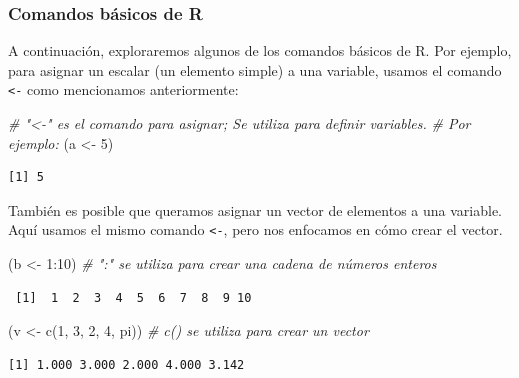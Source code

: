 \documentclass[
  12pt,
  spanish,
]{book}
\newenvironment{Shaded}{\begin{snugshade}}{\end{snugshade}}
\newcommand{\CommentTok}[1]{\textcolor[rgb]{0.56,0.35,0.01}{\textit{#1}}}
\newcommand{\DecValTok}[1]{\textcolor[rgb]{0.00,0.00,0.81}{#1}}
\newcommand{\FunctionTok}[1]{\textcolor[rgb]{0.00,0.00,0.00}{#1}}
\newcommand{\NormalTok}[1]{#1}
\newcommand{\OtherTok}[1]{\textcolor[rgb]{0.56,0.35,0.01}{#1}}
\newcommand{\SpecialCharTok}[1]{\textcolor[rgb]{0.00,0.00,0.00}{#1}}
\begin{document}
\hypertarget{comandos-buxe1sicos-de-r}{%
\subsubsection{Comandos básicos de R}\label{comandos-buxe1sicos-de-r}}

A continuación, exploraremos algunos de los comandos básicos de R. Por ejemplo, para asignar un escalar (un elemento simple) a una variable, usamos el comando \texttt{\textless{}-} como mencionamos anteriormente:

\begin{Shaded}
\begin{Highlighting}[]
\CommentTok{\# "\textless{}{-}"  es el comando para asignar; Se utiliza para definir variables.}
\CommentTok{\# Por ejemplo:}
\NormalTok{(a }\OtherTok{\textless{}{-}} \DecValTok{5}\NormalTok{)}
\end{Highlighting}
\end{Shaded}

\begin{verbatim}
[1] 5
\end{verbatim}

También es posible que queramos asignar un vector de elementos a una variable. Aquí usamos el mismo comando \texttt{\textless{}-}, pero nos enfocamos en cómo crear el vector.

\begin{Shaded}
\begin{Highlighting}[]
\NormalTok{(b }\OtherTok{\textless{}{-}} \DecValTok{1}\SpecialCharTok{:}\DecValTok{10}\NormalTok{) }\CommentTok{\# ":"  se utiliza para crear una cadena de números enteros}
\end{Highlighting}
\end{Shaded}

\begin{verbatim}
 [1]  1  2  3  4  5  6  7  8  9 10
\end{verbatim}

\begin{Shaded}
\begin{Highlighting}[]
\NormalTok{(v }\OtherTok{\textless{}{-}} \FunctionTok{c}\NormalTok{(}\DecValTok{1}\NormalTok{, }\DecValTok{3}\NormalTok{, }\DecValTok{2}\NormalTok{, }\DecValTok{4}\NormalTok{, pi)) }\CommentTok{\#  c() se utiliza para crear un vector}
\end{Highlighting}
\end{Shaded}

\begin{verbatim}
[1] 1.000 3.000 2.000 4.000 3.142
\end{verbatim}
\end{document}

